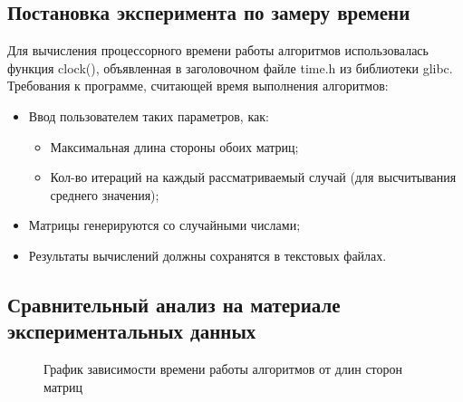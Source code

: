 \documentclass[a4paper,12pt]{article}
\begin{document}

\newpage
\subsection{Постановка эксперимента по замеру времени}
\begin{flushleft}
Для вычисления процессорного времени работы алгоритмов использовалась функция clock(), объявленная в заголовочном файле time.h из библиотеки glibc. \\
Требования к программе, считающей время выполнения алгоритмов:
\begin{itemize}
\item Ввод пользователем таких параметров, как:
\begin{itemize}
\item Максимальная длина стороны обоих матриц;
\item Кол-во итераций на каждый рассматриваемый случай (для высчитывания среднего значения);
\end{itemize}
\item Матрицы генерируются со случайными числами;
\item Результаты вычислений должны сохранятся в текстовых файлах.
\end{itemize}
\end{flushleft}

\newpage
\subsection{Сравнительный анализ на материале экспериментальных данных}

\begin{figure}[h!]
\caption{График зависимости времени работы алгоритмов от длин сторон матриц}
\label{images:graphics}
\end{figure}
\end{document}
